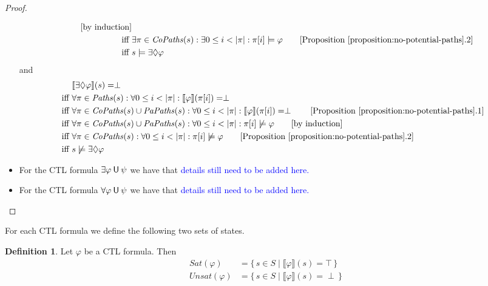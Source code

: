 \documentclass[12pt]{article}
\newcommand{\eventually}{\Diamond}
\newcommand{\until}{\mathbin{\sf U}}
\theoremstyle{definition}
\newtheorem{definition}{Definition}
\newcommand{\comment}[1]{\hspace{2em}[\mbox{#1}]}
\newcommand{\satisfaction}[1]{\llbracket #1 \rrbracket}
\newenvironment{franck}{\color{red}}{\color{black}}
\begin{document}
\begin{proof}
\begin{itemize}
\begin{franck}
\begin{align*}
\comment{by induction}\\
\mbox{iff } & \exists \pi \in \mathit{CoPaths}(s) : \exists 0 \leq i < |\pi| : \pi[i] \models \varphi
\comment{Proposition~\ref{proposition:no-potential-paths}.2}\\
\mbox{iff } & s \models \exists \eventually \varphi
\end{align*}
and
\begin{align*}
& \satisfaction{\exists \eventually \varphi}(s) = \perp\\
\mbox{iff } & \forall \pi \in \mathit{Paths}(s)  : \forall 0 \leq i < |\pi| : \satisfaction{\varphi}(\pi[i]) = \perp\\
\mbox{iff } & \forall \pi \in \mathit{CoPaths}(s) \cup \mathit{PaPaths}(s) : \forall 0 \leq i < |\pi| : \satisfaction{\varphi}(\pi[i]) = \perp
\comment{Proposition~\ref{proposition:no-potential-paths}.1}\\
\mbox{iff } & \forall \pi \in \mathit{CoPaths}(s) \cup \mathit{PaPaths}(s) : \forall 0 \leq i < |\pi| : \pi[i] \not\models \varphi \comment{by induction}\\
\mbox{iff } & \forall \pi \in \mathit{CoPaths}(s) : \forall 0 \leq i < |\pi| : \pi[i] \not\models \varphi \comment{Proposition~\ref{proposition:no-potential-paths}.2}\\
\mbox{iff } & s \not\models \exists \eventually \varphi
\end{align*}
\end{franck}
\item
For the CTL formula $\exists \varphi \until \psi$ we have that
\textcolor{blue}{details still need to be added here.}
\item
For the CTL formula $\forall \varphi \until \psi$ we have that \textcolor{blue}{details still need to be added here.}
\end{itemize}
\end{proof}

For each CTL formula we define the following two sets of states.

\begin{definition}
Let $\varphi$ be a CTL formula.  Then
\begin{align*}
\mathit{Sat}(\varphi) & = \{\, s \in S \mid \satisfaction{\varphi}(s) = \top \,\}\\
\mathit{Unsat}(\varphi) & = \{\, s \in S \mid \satisfaction{\varphi}(s) = \perp \,\}
\end{align*}
\end{definition}
\color{black}



\end{document}
